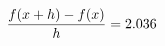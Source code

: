 \documentclass[preview]{standalone}
\begin{document}
\begin{align*}
\special{dvisvgm:raw <g id='unique000'>}\frac{f(x+h)-f(x)}{h} = 2.036\special{dvisvgm:raw </g>}
\end{align*}
\end{document}

